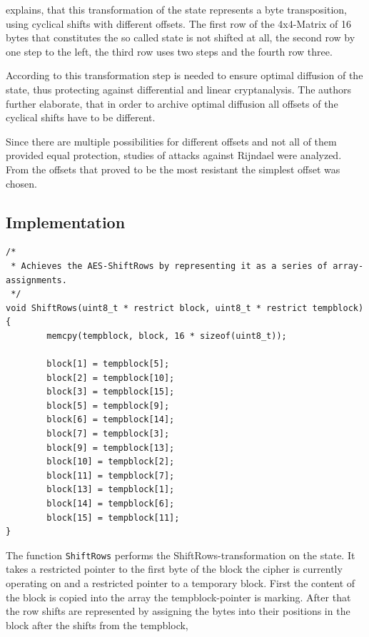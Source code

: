 \cite[p. 37]{rijndael} explains, that this transformation of the state represents a byte transposition, using
cyclical shifts with different offsets. The first row of the 4x4-Matrix
of 16 bytes that constitutes the so called state is not shifted at all,
the second row by one step to the left, the third row uses two steps and
the fourth row three.

According to \cite{rijndael} this transformation step is needed to ensure
optimal diffusion of the state, thus protecting
against differential and linear cryptanalysis. The authors further
elaborate, that in order to archive optimal diffusion all
offsets of the cyclical shifts have to be different.

Since there are multiple possibilities for different offsets and not all
of them provided equal protection, studies of attacks against Rijndael
were analyzed. From the offsets that proved to be the most resistant the
simplest offset was chosen.

\hypertarget{implementation-3}{%
\subsection{Implementation}\label{implementation-3}}

\begin{lstlisting}
/*
 * Achieves the AES-ShiftRows by representing it as a series of array-assignments.
 */
void ShiftRows(uint8_t * restrict block, uint8_t * restrict tempblock)
{
        memcpy(tempblock, block, 16 * sizeof(uint8_t));

        block[1] = tempblock[5];
        block[2] = tempblock[10];
        block[3] = tempblock[15];
        block[5] = tempblock[9];
        block[6] = tempblock[14];
        block[7] = tempblock[3];
        block[9] = tempblock[13];
        block[10] = tempblock[2];
        block[11] = tempblock[7];
        block[13] = tempblock[1];
        block[14] = tempblock[6];
        block[15] = tempblock[11];
}
\end{lstlisting}

The function \lstinline|ShiftRows| performs the ShiftRows-transformation on the
state. It takes a restricted pointer to the first byte of the block the
cipher is currently operating on and a restricted pointer to a temporary
block. First the content of the block is copied into the array the
tempblock-pointer is marking. After that the row shifts are represented
by assigning the bytes into their positions in the block after the
shifts from the tempblock,


